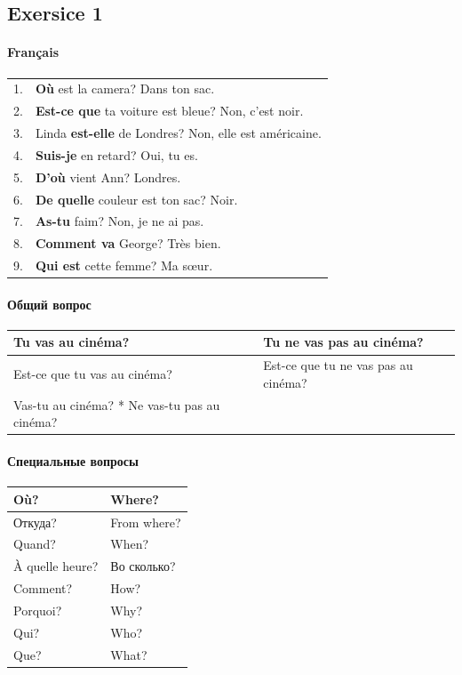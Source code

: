 \documentclass[9pt, oneside]{article}
\begin{document}
\subsection{Exersice 1}

\paragraph{Français}
\begin{tabular}{l l}
1. & {\bfseries Où} est la camera? Dans ton sac. \\
2. & {\bfseries Est-ce que} ta voiture est bleue? Non, c'est noir.\\
3. & Linda {\bfseries est-elle} de Londres? Non, elle est américaine.\\
4. & {\bfseries Suis-je} en retard? Oui, tu es.\\
5. & {\bfseries D'où} vient Ann? Londres.\\
6. & {\bfseries De quelle} couleur est ton sac? Noir.\\
7. & {\bfseries As-tu} faim? Non, je ne ai pas.\\
8. & {\bfseries Comment va} George? Très bien.\\
9. & {\bfseries Qui est} cette femme? Ma sœur.\\
\end{tabular}

\paragraph*{Общий вопрос}
\begin{tabular}{l|l}
	Tu vas au cinéma? & Tu ne vas pas au cinéma?\\
	\hline
	Est-ce que tu vas au cinéma? & Est-ce que tu ne vas pas au cinéma?\\
	\hline
	Vas-tu au cinéma? * Ne vas-tu pas au cinéma?\\
\end{tabular}

\paragraph*{Специальные вопросы}
\begin{tabular}{l|l}
	Où? & Where?\\
	\hline
	Откуда? & From where?\\
	\hline
	Quand? & When? \\
	\hline
	À quelle heure? & Во сколько?\\
	\hline
	Comment? & How?\\
	\hline
	Porquoi? & Why?\\
\hline
	Qui? & Who?\\
\hline
	Que? & What?\\
\end{tabular}
\end{document}
